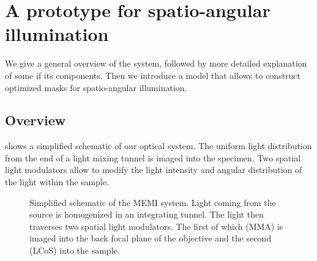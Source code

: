 
\newcommand{\imagw}[3]{
  \begin{figure}[!hbt]
    \centering
    \texttt{[image: \#2]}
    \caption{#3}
    \label{fig:#2}
  \end{figure}
}

\newcommand{\imag}[2]{\imagw{16cm}{#1}{#2}}

\chapter{A prototype for spatio-angular illumination}
\begin{summary}
  We give a general overview of the system, followed by more detailed
  explanation of some if its components. Then we introduce a model
  that allows to construct optimized masks for spatio-angular
  illumination.
\end{summary}

\section{Overview}
 shows a simplified schematic of our optical
system. The uniform light distribution from the end of a light mixing
tunnel is imaged into the specimen. Two spatial light modulators allow
to modify the light intensity and angular distribution of the light
within the sample.

\begin{figure}[!hbt]
  \centering
  \def\svgscale{1.5}
  
  \caption{Simplified schematic of the MEMI system. Light coming from
    the source is homogenized in an integrating tunnel. The light then
    traverses two spatial light modulators. The first of which (MMA)
    is imaged into the back focal plane of the objective and the
    second (LCoS) into the sample.}
  \label{fig:memi-simple}
\end{figure}

